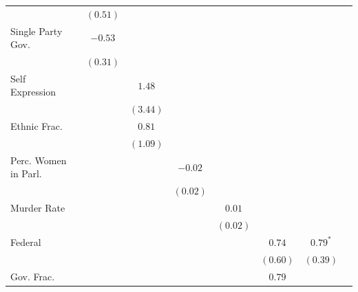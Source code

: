 \documentclass[a4paper]{article}\usepackage[]{graphicx}\usepackage[]{color}
\begin{document}
\begin{table}
\begin{center}
{\begin{tabular}{l c c c c c c c c }
                        &               & $(0.51)$      &               &              &              &              &               &              \\
Single Party Gov.       &               & $-0.53$       &               &              &              &              &               &              \\
                        &               & $(0.31)$      &               &              &              &              &               &              \\
Self Expression         &               &               & $1.48$        &              &              &              &               &              \\
                        &               &               & $(3.44)$      &              &              &              &               &              \\
Ethnic Frac.            &               &               & $0.81$        &              &              &              &               &              \\
                        &               &               & $(1.09)$      &              &              &              &               &              \\
Perc. Women in Parl.    &               &               &               & $-0.02$      &              &              &               &              \\
                        &               &               &               & $(0.02)$     &              &              &               &              \\
Murder Rate             &               &               &               &              & $0.01$       &              &               &              \\
                        &               &               &               &              & $(0.02)$     &              &               &              \\
Federal                 &               &               &               &              &              & $0.74$       & $0.79^{*}$    &              \\
                        &               &               &               &              &              & $(0.60)$     & $(0.39)$      &              \\
Gov. Frac.              &               &               &               &              &              & $0.79$       &               &              \\

\end{tabular}}
\end{center}
\end{table}
\end{document}

